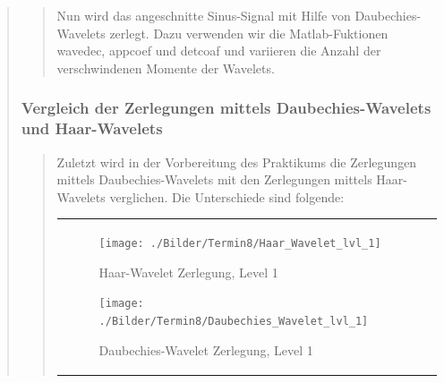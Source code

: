 \begin{quote}
\begin{quote}
        Nun wird das angeschnitte Sinus-Signal mit Hilfe von Daubechies-Wavelets
        zerlegt. Dazu verwenden wir die Matlab-Fuktionen wavedec, appcoef
        und detcoaf und variieren die Anzahl der verschwindenen
        Momente der Wavelets.
        
        
        \end{quote}%
        
        
        \subsubsection{Vergleich der Zerlegungen mittels
        Daubechies-Wavelets und Haar-Wavelets}
        \begin{quote}
        
        Zuletzt wird in der Vorbereitung des Praktikums die Zerlegungen mittels
        Daubechies-Wavelets mit den Zerlegungen mittels Haar-Wavelets
        verglichen. Die Unterschiede sind folgende:
        
        \begin{center}
                \begin{tabular}{ll}
    
                \hspace{-12em}
                    \begin{minipage}{0.6\textwidth}
    
                        \begin{figure}[H]
                            \label{fig:}
                            \texttt{[image: ./Bilder/Termin8/Haar\_Wavelet\_lvl\_1]}
                            \caption{Haar-Wavelet Zerlegung, Level 1}
                        \end{figure}
    
                    \end{minipage}
                    \begin{minipage}{0.6\textwidth}
    
                        \begin{figure}[H]
                            \label{fig:}
                            \texttt{[image: ./Bilder/Termin8/Daubechies\_Wavelet\_lvl\_1]}
                            \caption{Daubechies-Wavelet Zerlegung, Level 1}
                        \end{figure}
                    \vspace{-1.5em}
    

\end{minipage}
\end{tabular}
\end{center}
\end{quote}
\end{quote}
